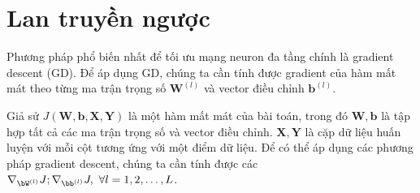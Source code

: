  
 

 
\section{Lan truyền ngược}

Phương pháp phổ biến nhất để tối ưu mạng neuron đa tầng chính là gradient
descent (GD). Để áp dụng GD, chúng ta cần tính được gradient của hàm mất mát
theo từng ma trận trọng số $\mathbf{W}^{(l)}$ và vector điều chỉnh $\mathbf{b}^{(l)}$.

 
 
Giả sử $J(\mathbf{W, b, X, Y})$ là một hàm mất mát của bài toán, trong đó
$\mathbf{W, b}$ là tập hợp tất cả các ma trận trọng số và vector điều chỉnh. $\mathbf{X, Y}$ là cặp dữ liệu huấn luyện với mỗi cột
tương ứng với một điểm dữ liệu. Để có thể áp dụng các phương pháp gradient descent,
chúng ta cần tính được các 
\begin{math}
    \nabla_{\bW^{(l)}}J; \nabla_{\bb^{(l)}}J, ~\forall l = 1, 2, \dots, L
\end{math}.

